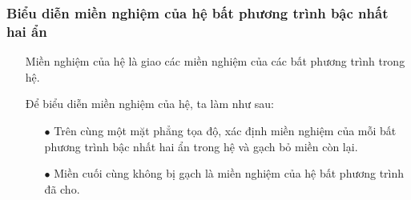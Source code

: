 \subsubsection{Biểu diễn miền nghiệm của hệ bất phương trình bậc nhất hai ẩn}
\begin{itemize}
	\item [\iconMT] Miền nghiệm của hệ là giao các miền nghiệm của các bất phương trình trong hệ.
	\item [\iconMT] Để biểu diễn miền nghiệm của hệ, ta làm như sau:
	\begin{boxdn}
	\begin{itemize}
		\item [$\bullet$] Trên cùng một mặt phẳng tọa độ, xác định miền nghiệm của mỗi bất phương trình bậc nhất hai ẩn trong hệ và gạch bỏ miền còn lại.
		\item [$\bullet$] Miền cuối cùng không bị gạch là miền nghiệm của hệ bất phương trình đã cho.
	\end{itemize}
	\end{boxdn}
\end{itemize}
